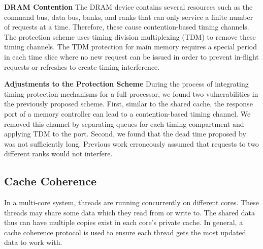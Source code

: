 \textbf{DRAM Contention}
The DRAM device contains several resources such as the command bus, data
bus, banks, and ranks that can only service a finite number of requests at a time. 
Therefore, these cause contention-based timing channels.
The protection scheme uses timing division multiplexing (TDM) to remove these
timing channels. The TDM protection for main memory requires a special period 
in each time slice where no new
request can be issued in order to prevent in-flight requests or refreshes to
create timing interference.


\textbf{Adjustments to the Protection Scheme}
During the process of integrating timing protection mechanisms for a full
processor, we found two vulnerabilities in the previously proposed scheme.
First, similar to the shared cache, the response port of a memory controller
can lead to a contention-based timing channel. We removed this channel by
separating queues for each timing compartment and applying TDM to the port.
Second, we found that the dead time proposed by ~\cite{ushpca14} was 
not sufficiently long. Previous work erroneously assumed that requests to two
different ranks would not interfere.

\subsection{Cache Coherence}
In a multi-core system, threads are running concurrently on different cores. These threads may share some
data which they read from or write to. The shared data thus can have multiple copies exist in each core's
private cache. In general, a cache coherence protocol is used to ensure each thread gets the most updated
data to work with.

